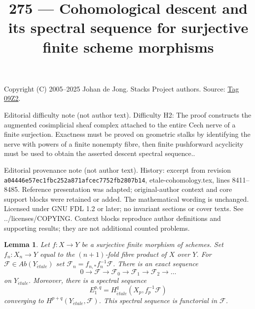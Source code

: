 \documentclass{amsart}
\theoremstyle{plain}
\newtheorem{lemma}[subsection]{Lemma}
\theoremstyle{definition}
\theoremstyle{remark}
\numberwithin{equation}{subsection}
\def\etale{{\acute{e}tale}}
\begin{document}
\title[Stacks Project, Tag 09Z2]{275 --- Cohomological descent and its spectral sequence for surjective finite scheme morphisms}
\maketitle
\noindent Copyright (C) 2005--2025 Johan de Jong. Stacks Project authors. Source: \href{https://stacks.math.columbia.edu/tag/09Z2}{Tag 09Z2}.

\noindent Editorial difficulty note (not author text). Difficulty H2: The proof constructs the augmented cosimplicial sheaf complex attached to the entire Cech nerve of a finite surjection. Exactness must be proved on geometric stalks by identifying the nerve with powers of a finite nonempty fibre, then finite pushforward acyclicity must be used to obtain the asserted descent spectral sequence..

\noindent Editorial provenance note (not author text). History: excerpt from revision \texttt{a0444\allowbreak 6e57e\allowbreak c1fbc\allowbreak 252a8\allowbreak 71afc\allowbreak ec775\allowbreak 2fb28\allowbreak 07b14}, etale-cohomology.tex, lines 8411--8485. Reference presentation was adapted; original-author context and core support blocks were retained or added. The mathematical wording is unchanged. Licensed under GNU FDL 1.2 or later; no invariant sections or cover texts. See ../licenses/COPYING. Context blocks reproduce author definitions and supporting results; they are not additional counted problems.

\begin{lemma}
\label{lemma-cohomological-descent-finite}
Let $f : X \to Y$ be a surjective finite morphism of schemes.
Set $f_n : X_n \to Y$ equal to the $(n + 1)$-fold fibre product
of $X$ over $Y$. For $\mathcal{F} \in \textit{Ab}(Y_\etale)$ set
$\mathcal{F}_n = f_{n, *}f_n^{-1}\mathcal{F}$. There is an exact
sequence
$$
0 \to \mathcal{F} \to \mathcal{F}_0 \to \mathcal{F}_1 \to
\mathcal{F}_2 \to \ldots
$$
on $Y_\etale$. Moreover, there is a spectral sequence
$$
E_1^{p, q} = H^q_\etale(X_p, f_p^{-1}\mathcal{F})
$$
converging to $H^{p + q}(Y_\etale, \mathcal{F})$.
This spectral sequence is functorial in $\mathcal{F}$.
\end{lemma}
\end{document}
